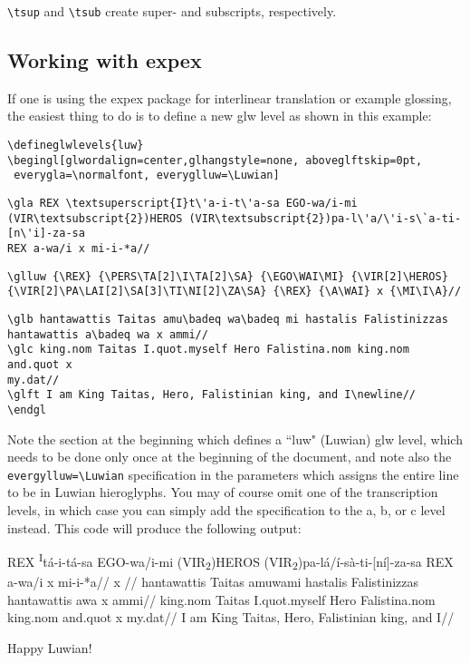 \documentclass[12pt,A4]{article}
\begin{document}
\verb|\tsup| and \verb|\tsub| create super- and subscripts, respectively.

\subsection{Working with expex}

If one is using the expex package for interlinear translation or example glossing, the easiest thing to do is to define a new glw level as shown in this example:
\color{red}
\begin{verbatim}
\defineglwlevels{luw}
\begingl[glwordalign=center,glhangstyle=none, aboveglftskip=0pt, 
 everygla=\normalfont, everyglluw=\Luwian]
\end{verbatim}\color{black}
\begin{verbatim}
\gla REX \textsuperscript{I}t\'a-i-t\'a-sa EGO-wa/i-mi 
(VIR\textsubscript{2})HEROS (VIR\textsubscript{2})pa-l\'a/\'i-s\`a-ti-[n\'i]-za-sa 
REX a-wa/i x mi-i-*a//
\end{verbatim}\color{red}
\begin{verbatim}
\glluw {\REX} {\PERS\TA[2]\I\TA[2]\SA} {\EGO\WAI\MI} {\VIR[2]\HEROS} 
{\VIR[2]\PA\LAI[2]\SA[3]\TI\NI[2]\ZA\SA} {\REX} {\A\WAI} x {\MI\I\A}//
\end{verbatim}\color{black}
\begin{verbatim}
\glb hantawattis Taitas amu\badeq wa\badeq mi hastalis Falistinizzas 
hantawattis a\badeq wa x ammi//
\glc king.nom Taitas I.quot.myself Hero Falistina.nom king.nom and.quot x 
my.dat//
\glft I am King Taitas, Hero, Falistinian king, and I\newline//
\endgl
\end{verbatim}

Note the section at the beginning which defines a ``luw" (Luwian) glw level, which needs to be done only once at the beginning of the document, and note also the \verb|evergylluw=\Luwian| specification in the parameters which assigns the entire line to be in Luwian hieroglyphs. You may of course omit one of the transcription levels, in which case you can simply add the specification to the a, b, or c level instead. This code will produce the following output:\\


\begingl[glwordalign=center,glhangstyle=none, aboveglftskip=0pt, everygla=\normalfont, everyglluw=\Luwian]
\gla REX \textsuperscript{I}t\'a-i-t\'a-sa EGO-wa/i-mi (VIR\textsubscript{2})HEROS (VIR\textsubscript{2})pa-l\'a/\'i-s\`a-ti-[n\'i]-za-sa REX a-wa/i x mi-i-*a//
\glluw {\REX} {\PERS\TA[2]\I\TA[2]\SA} {\EGO\WAI\MI} {\VIR[2]\HEROS} {\VIR[2]\PA\LAI[2]\SA[3]\TI\NI[2]\ZA\SA} {\REX} {\A\WAI} x {\MI\I\A}//
\glb hantawattis Taitas amu\badeq wa\badeq mi hastalis Falistinizzas hantawattis a\badeq wa x ammi//
\glc king.nom Taitas I.quot.myself Hero Falistina.nom king.nom and.quot x my.dat//
\glft I am King Taitas, Hero, Falistinian king, and I\newline//
\endgl

Happy Luwian!
\end{document}
